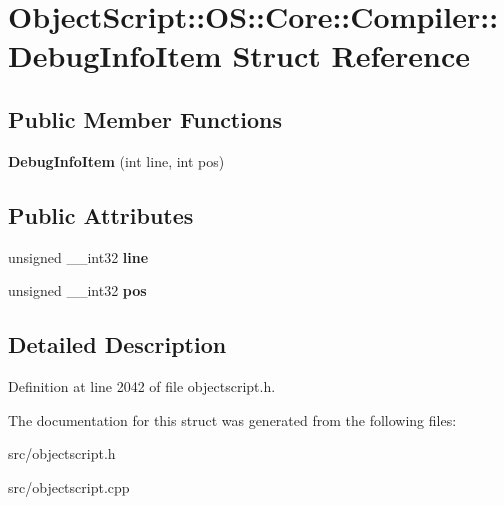 \hypertarget{struct_object_script_1_1_o_s_1_1_core_1_1_compiler_1_1_debug_info_item}{}\section{Object\+Script\+:\+:OS\+:\+:Core\+:\+:Compiler\+:\+:Debug\+Info\+Item Struct Reference}
\label{struct_object_script_1_1_o_s_1_1_core_1_1_compiler_1_1_debug_info_item}
\subsection*{Public Member Functions}
\begin{DoxyCompactItemize}
\item 
{\bfseries Debug\+Info\+Item} (int line, int pos)\hypertarget{struct_object_script_1_1_o_s_1_1_core_1_1_compiler_1_1_debug_info_item_a396f871509cd31ff5e008cfa4ebb6b29}{}\label{struct_object_script_1_1_o_s_1_1_core_1_1_compiler_1_1_debug_info_item_a396f871509cd31ff5e008cfa4ebb6b29}

\end{DoxyCompactItemize}
\subsection*{Public Attributes}
\begin{DoxyCompactItemize}
\item 
unsigned \+\_\+\+\_\+int32 {\bfseries line}\hypertarget{struct_object_script_1_1_o_s_1_1_core_1_1_compiler_1_1_debug_info_item_ad12acaa5bb06e40af8ab86bb94f645c5}{}\label{struct_object_script_1_1_o_s_1_1_core_1_1_compiler_1_1_debug_info_item_ad12acaa5bb06e40af8ab86bb94f645c5}

\item 
unsigned \+\_\+\+\_\+int32 {\bfseries pos}\hypertarget{struct_object_script_1_1_o_s_1_1_core_1_1_compiler_1_1_debug_info_item_a5aae13af81bff22f95ed40b3135ef9d4}{}\label{struct_object_script_1_1_o_s_1_1_core_1_1_compiler_1_1_debug_info_item_a5aae13af81bff22f95ed40b3135ef9d4}

\end{DoxyCompactItemize}


\subsection{Detailed Description}


Definition at line 2042 of file objectscript.\+h.



The documentation for this struct was generated from the following files\+:\begin{DoxyCompactItemize}
\item 
src/objectscript.\+h\item 
src/objectscript.\+cpp\end{DoxyCompactItemize}
